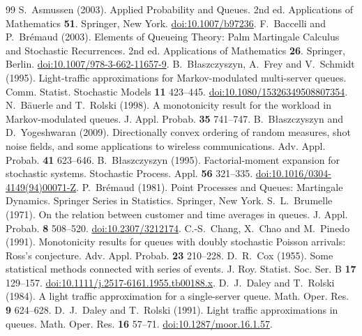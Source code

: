 \documentclass[10pt,a4paper]{amsart}
\numberwithin{equation}{section}
\newcommand{\1}{\mathbf 1}
\begin{document}
\begin{thebibliography}{99}
 S.~Asmussen (2003). Applied Probability and Queues. 2nd ed. Applications of Mathematics \textbf{51}. Springer, New York. \href{https://doi.org/10.1007/b97236}{doi:10.1007/b97236}.
 F.~Baccelli and P.~Br\'emaud (2003). Elements of Queueing Theory: Palm Martingale Calculus and Stochastic Recurrences. 2nd ed. Applications of Mathematics \textbf{26}. Springer, Berlin. \href{https://doi.org/10.1007/978-3-662-11657-9}{doi:10.1007/978-3-662-11657-9}.
 B.~B{\l}aszczyszyn, A.~Frey and V.~Schmidt (1995). Light-traffic approximations for Markov-modulated multi-server queues. Comm. Statist. Stochastic Models \textbf{11} 423--445. \href{https://doi.org/10.1080/15326349508807354}{doi:10.1080/15326349508807354}.
 N.~B\"auerle and T.~Rolski (1998). A monotonicity result for the workload in Markov-modulated queues. J. Appl. Probab. \textbf{35} 741--747.
 B.~B{\l}aszczyszyn and D.~Yogeshwaran (2009). Directionally convex ordering of random measures, shot noise fields, and some applications to wireless communications. Adv. Appl. Probab. \textbf{41} 623--646.
 B.~B{\l}aszczyszyn (1995). Factorial-moment expansion for stochastic systems. Stochastic Process. Appl. \textbf{56} 321--335. \href{https://doi.org/10.1016/0304-4149(94)00071-Z}{doi:10.1016/0304-4149(94)00071-Z}.
 P.~Br\'emaud (1981). Point Processes and Queues: Martingale Dynamics. Springer Series in Statistics. Springer, New York.
 S.~L.~Brumelle (1971). On the relation between customer and time averages in queues. J. Appl. Probab. \textbf{8} 508--520. \href{https://doi.org/10.2307/3212174}{doi:10.2307/3212174}.
 C.-S.~Chang, X.~Chao and M.~Pinedo (1991). Monotonicity results for queues with doubly stochastic Poisson arrivals: Ross's conjecture. Adv. Appl. Probab. \textbf{23} 210--228.
 D.~R.~Cox (1955). Some statistical methods connected with series of events. J. Roy. Statist. Soc. Ser. B \textbf{17} 129--157. \href{https://doi.org/10.1111/j.2517-6161.1955.tb00188.x}{doi:10.1111/j.2517-6161.1955.tb00188.x}.
 D.~J.~Daley and T.~Rolski (1984). A light traffic approximation for a single-server queue. Math. Oper. Res. \textbf{9} 624--628.
 D.~J.~Daley and T.~Rolski (1991). Light traffic approximations in queues. Math. Oper. Res. \textbf{16} 57--71. \href{https://doi.org/10.1287/moor.16.1.57}{doi:10.1287/moor.16.1.57}.

\end{thebibliography}
\end{document}
